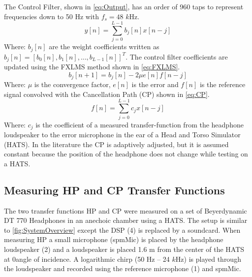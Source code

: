 The Control Filter, shown in \autoref{eq:Output}, has an order of 960 taps to represent frequencies down to 50 Hz with $f_s = 48$ $k$Hz. 
\begin{equation}\label{eq:Output}
y[n]=\sum_{j=0}^{L-1}b_j[n]x[n-j]
\end{equation}
Where: $b_j[n]$ are the weight coefficients written as  $b_j[n]=[b_0[n],b_1[n], \dotsc, b_{L-1}[n]]^T$. The control filter coefficients are updated using the FXLMS method shown in \autoref{eq:FXLMS}.
\begin{equation}\label{eq:FXLMS}
b_j[n+1] = b_j[n] - 2\mu e[n]f[n-j]
\end{equation}
Where: $\mu$ is the convergence factor, $e[n]$ is the error and $f[n]$ is the reference signal convolved with the Cancellation Path (CP) shown in \autoref{eq:CP}.
\begin{equation}\label{eq:CP}
f[n]=\sum_{j=0}^{L-1}c_jx[n-j]
\end{equation}
Where: $c_j$ is the coefficient of a measured transfer-function from the headphone loudspeaker to the error microphone in the ear of a Head and Torso Simulator (HATS). In the literature \cite{Hansen} the CP is adaptively adjusted, but it is assumed constant because the position of the headphone does not change while testing on a HATS. 


\subsection{Measuring HP and CP Transfer Functions}
The two transfer functions HP and CP were measured on a set of Beyerdynamic DT 770 Headphones in an anechoic chamber using a HATS. The setup is similar to \autoref{fig:SystemOverview} except the DSP (4) is replaced by a soundcard. When measuring HP a small microphone (spmMic) is placed by the headphone loudspeaker (2) and a loudspeaker is placed 1.6 m from the center of the HATS at 0\textdegree angle of incidence. A logarithmic chirp (50 Hz -- 24 $k$Hz) is played through the loudspeaker and recorded using the reference microphone (1) and spmMic. \\\\

